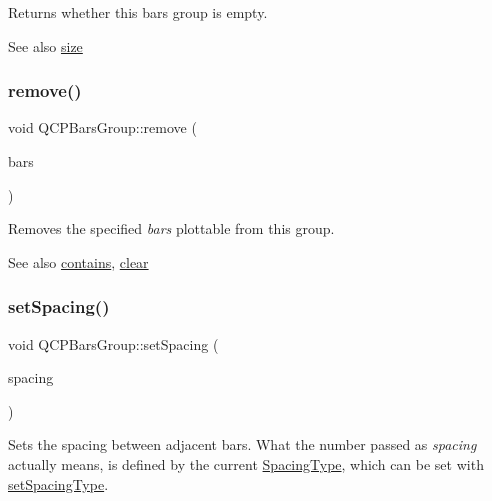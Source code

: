 Returns whether this bars group is empty.

\begin{DoxySeeAlso}{See also}
\hyperlink{class_q_c_p_bars_group_a3780ec77919cb00840207ec7a0f00dd5}{size} 
\end{DoxySeeAlso}
\hypertarget{class_q_c_p_bars_group_a215e28a5944f1159013a0e19169220e7}{}\label{class_q_c_p_bars_group_a215e28a5944f1159013a0e19169220e7} 
\subsubsection{\texorpdfstring{remove()}{remove()}}
{\footnotesize\ttfamily void Q\+C\+P\+Bars\+Group\+::remove (\begin{DoxyParamCaption}\item[{\hyperlink{class_q_c_p_bars}{Q\+C\+P\+Bars} $\ast$}]{bars }\end{DoxyParamCaption})}

Removes the specified {\itshape bars} plottable from this group.

\begin{DoxySeeAlso}{See also}
\hyperlink{class_q_c_p_bars_group_ae26da07a23553052a178fb3fae90d0dc}{contains}, \hyperlink{class_q_c_p_bars_group_a3ddf23928c6cd89530bd34ab7ba7b177}{clear} 
\end{DoxySeeAlso}
\hypertarget{class_q_c_p_bars_group_aa553d327479d72a0c3dafcc724a190e2}{}\label{class_q_c_p_bars_group_aa553d327479d72a0c3dafcc724a190e2} 
\subsubsection{\texorpdfstring{set\+Spacing()}{setSpacing()}}
{\footnotesize\ttfamily void Q\+C\+P\+Bars\+Group\+::set\+Spacing (\begin{DoxyParamCaption}\item[{double}]{spacing }\end{DoxyParamCaption})}

Sets the spacing between adjacent bars. What the number passed as {\itshape spacing} actually means, is defined by the current \hyperlink{class_q_c_p_bars_group_a4c0521120a97e60bbca37677a37075b6}{Spacing\+Type}, which can be set with \hyperlink{class_q_c_p_bars_group_a2c7e2d61b10594a4555b615e1fcaf49e}{set\+Spacing\+Type}.

